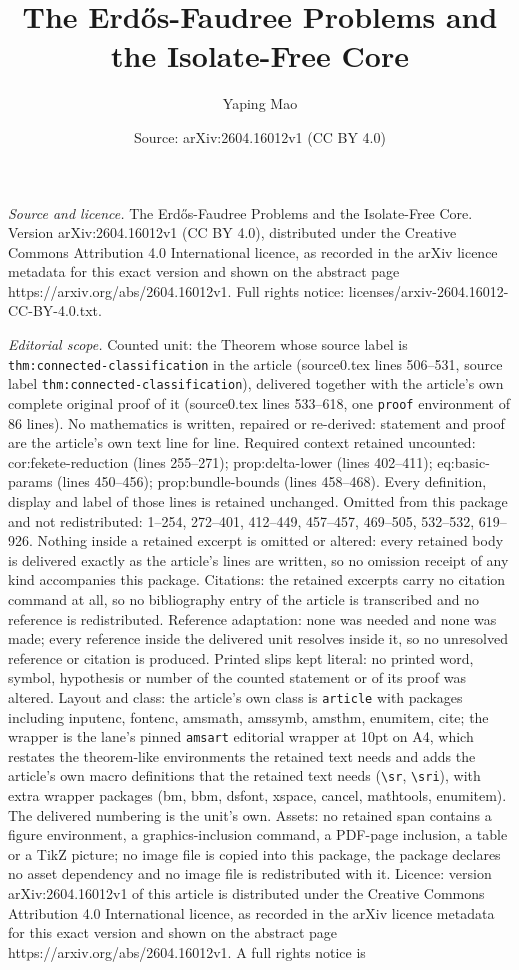 \documentclass[10pt,a4paper]{amsart}
\title[The Erd\H{o}s-Faudree Problems and the Isolate-Free Core]{The Erd\H{o}s-Faudree Problems and the Isolate-Free Core}
\author{Yaping Mao}
\date{Source: arXiv:2604.16012v1 (CC BY 4.0)}
\begin{document}
\maketitle

\noindent\emph{Source and licence.} The Erd\H{o}s-Faudree Problems and the Isolate-Free Core. Version arXiv:2604.16012v1 (CC BY 4.0), distributed under the Creative Commons Attribution 4.0 International licence, as recorded in the arXiv licence metadata for this exact version and shown on the abstract page https://arxiv.org/abs/2604.16012v1. Full rights notice: licenses/arxiv-2604.16012-CC-BY-4.0.txt.\par\smallskip

\noindent\textit{Editorial scope.} Counted unit: the Theorem whose source label is \texttt{thm:connected-classification} in the article (source0.tex lines 506--531, source label \texttt{thm:connected-classification}), delivered together with the article's own complete original proof of it (source0.tex lines 533--618, one \texttt{proof} environment of 86 lines). No mathematics is written, repaired or re-derived: statement and proof are the article's own text line for line. Required context retained uncounted: cor:fekete-reduction (lines 255--271); prop:delta-lower (lines 402--411); eq:basic-params (lines 450--456); prop:bundle-bounds (lines 458--468). Every definition, display and label of those lines is retained unchanged. Omitted from this package and not redistributed: 1--254, 272--401, 412--449, 457--457, 469--505, 532--532, 619--926. Nothing inside a retained excerpt is omitted or altered: every retained body is delivered exactly as the article's lines are written, so no omission receipt of any kind accompanies this package. Citations: the retained excerpts carry no citation command at all, so no bibliography entry of the article is transcribed and no reference is redistributed. Reference adaptation: none was needed and none was made; every reference inside the delivered unit resolves inside it, so no unresolved reference or citation is produced. Printed slips kept literal: no printed word, symbol, hypothesis or number of the counted statement or of its proof was altered. Layout and class: the article's own class is \texttt{article} with packages including inputenc, fontenc, amsmath, amssymb, amsthm, enumitem, cite; the wrapper is the lane's pinned \texttt{amsart} editorial wrapper at 10pt on A4, which restates the theorem-like environments the retained text needs and adds the article's own macro definitions that the retained text needs (\texttt{\textbackslash sr}, \texttt{\textbackslash sri}), with extra wrapper packages (bm, bbm, dsfont, xspace, cancel, mathtools, enumitem). The delivered numbering is the unit's own. Assets: no retained span contains a figure environment, a graphics-inclusion command, a PDF-page inclusion, a table or a TikZ picture; no image file is copied into this package, the package declares no asset dependency and no image file is redistributed with it. Licence: version arXiv:2604.16012v1 of this article is distributed under the Creative Commons Attribution 4.0 International licence, as recorded in the arXiv licence metadata for this exact version and shown on the abstract page https://arxiv.org/abs/2604.16012v1. A full rights notice is 
\end{document}
